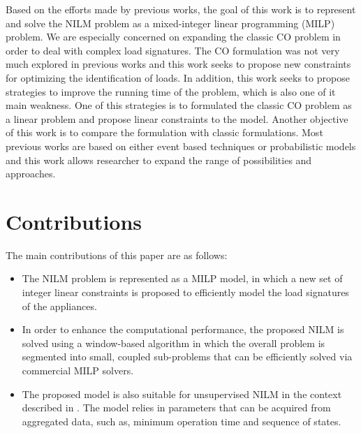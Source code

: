 Based on the efforts made by previous works, the goal of this work is to represent and solve the NILM problem as a mixed-integer linear programming (MILP) problem. We are especially concerned on expanding the classic CO problem in order to deal with complex load signatures. The CO formulation was not very much explored in previous works and this work seeks to propose new constraints for optimizing the identification of loads. In addition, this work seeks to propose strategies to improve the running time of the problem, which is also one of it main weakness. One of this strategies is to formulated the classic CO problem as a linear problem and propose linear constraints to the model. Another objective of this work is to compare the formulation with classic formulations. Most previous works are based on either event based techniques or probabilistic models and this work allows researcher to expand the range of possibilities and approaches.


\section{Contributions}

The main contributions of this paper are as follows:

\begin{itemize}
\item The NILM problem is represented as a MILP model, in which a new set of integer linear constraints is proposed to efficiently model the load signatures of the appliances.
\item In order to enhance the computational performance, the proposed NILM is solved using a window-based algorithm in which the overall problem is segmented into small, coupled sub-problems that can be efficiently solved via commercial MILP solvers.
\item The proposed model is also suitable for unsupervised NILM in the context described in \cite{makonin2016}. The model relies in parameters that can be acquired from aggregated data, such as, minimum operation time and sequence of states.
\end{itemize}

